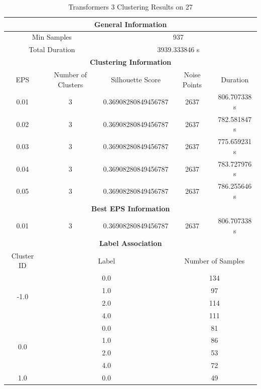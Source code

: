 \begin{longtable}{|c|c|c|c|c|}
\caption{Transformers 3 Clustering Results on 27} \label{tab:27_transformers_3_clustering_results}\\
\hline
\multicolumn{5}{|c|}{\textbf{General Information}} \\
\hline
\multicolumn{2}{|c|}{Min Samples} & \multicolumn{3}{c|}{937} \\
\multicolumn{2}{|c|}{Total Duration} & \multicolumn{3}{c|}{3939.333846 s} \\
\hline
\multicolumn{5}{|c|}{\textbf{Clustering Information}} \\
\hline
EPS & Number of Clusters & Silhouette Score & Noise Points & Duration \\
0.01 & 3 & 0.36908280849456787 & 2637 & 806.707338 s\\
0.02 & 3 & 0.36908280849456787 & 2637 & 782.581847 s\\
0.03 & 3 & 0.36908280849456787 & 2637 & 775.659231 s\\
0.04 & 3 & 0.36908280849456787 & 2637 & 783.727976 s\\
0.05 & 3 & 0.36908280849456787 & 2637 & 786.255646 s\\
\hline
\multicolumn{5}{|c|}{\textbf{Best EPS Information}} \\
\hline
0.01 & 3 & 0.36908280849456787 & 2637 & 806.707338 s\\
\hline
\multicolumn{5}{|c|}{\textbf{Label Association}} \\
\hline
Cluster ID & \multicolumn{2}{c|}{Label} & \multicolumn{2}{c|}{Number of Samples} \\
\hline
\multirow{4}{*}{-1.0} & \multicolumn{2}{c|}{0.0} & \multicolumn{2}{c|}{134} \\
& \multicolumn{2}{c|}{1.0} & \multicolumn{2}{c|}{97} \\
& \multicolumn{2}{c|}{2.0} & \multicolumn{2}{c|}{114} \\
& \multicolumn{2}{c|}{4.0} & \multicolumn{2}{c|}{111} \\
\hline
\multirow{4}{*}{0.0} & \multicolumn{2}{c|}{0.0} & \multicolumn{2}{c|}{81} \\
& \multicolumn{2}{c|}{1.0} & \multicolumn{2}{c|}{86} \\
& \multicolumn{2}{c|}{2.0} & \multicolumn{2}{c|}{53} \\
& \multicolumn{2}{c|}{4.0} & \multicolumn{2}{c|}{72} \\
\hline
\multirow{4}{*}{1.0} & \multicolumn{2}{c|}{0.0} & \multicolumn{2}{c|}{49} \\

\end{longtable}
